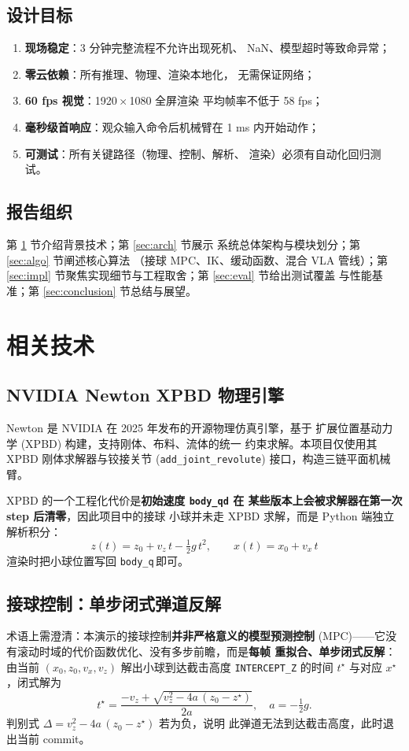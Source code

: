 \documentclass[12pt, a4paper, UTF8]{ctexart}
\begin{document}
\subsection{设计目标}
\begin{enumerate}[leftmargin=*]
  \item \textbf{现场稳定}：3 分钟完整流程不允许出现死机、
    NaN、模型超时等致命异常；
  \item \textbf{零云依赖}：所有推理、物理、渲染本地化，
    无需保证网络；
  \item \textbf{60 fps 视觉}：1920\,$\times$\,1080 全屏渲染
    平均帧率不低于 58 fps；
  \item \textbf{毫秒级首响应}：观众输入命令后机械臂在 1 ms
    内开始动作；
  \item \textbf{可测试}：所有关键路径（物理、控制、解析、
    渲染）必须有自动化回归测试。
\end{enumerate}

\subsection{报告组织}
第 \ref{sec:tech} 节介绍背景技术；第 \ref{sec:arch} 节展示
系统总体架构与模块划分；第 \ref{sec:algo} 节阐述核心算法
（接球 MPC、IK、缓动函数、混合 VLA 管线）；第 \ref{sec:impl}
节聚焦实现细节与工程取舍；第 \ref{sec:eval} 节给出测试覆盖
与性能基准；第 \ref{sec:conclusion} 节总结与展望。

\section{相关技术}\label{sec:tech}

\subsection{NVIDIA Newton XPBD 物理引擎}
Newton 是 NVIDIA 在 2025 年发布的开源物理仿真引擎，基于
扩展位置基动力学 (XPBD) 构建，支持刚体、布料、流体的统一
约束求解。本项目仅使用其 XPBD 刚体求解器与铰接关节
(\texttt{add\_joint\_revolute}) 接口，构造三链平面机械臂。

XPBD 的一个工程化代价是\textbf{初始速度 \texttt{body\_qd} 在
某些版本上会被求解器在第一次 step 后清零}，因此项目中的接球
小球并未走 XPBD 求解，而是 Python 端独立解析积分：
\[ z(t) = z_0 + v_z\, t - \tfrac{1}{2} g\, t^2,
   \qquad x(t) = x_0 + v_x\, t \]
渲染时把小球位置写回 \texttt{body\_q}\,即可。

\subsection{接球控制：单步闭式弹道反解}
术语上需澄清：本演示的接球控制\textbf{并非严格意义的模型预测控制}
(MPC)——它没有滚动时域的代价函数优化、没有多步前瞻，而是\textbf{每帧
重拟合、单步闭式反解}：由当前 $(x_0, z_0,
v_x, v_z)$ 解出小球到达截击高度 \texttt{INTERCEPT\_Z}
的时间 $t^\star$ 与对应 $x^\star$，闭式解为
\[
t^\star = \frac{-v_z + \sqrt{v_z^2 - 4a\,(z_0 - z^\star)}}{2a},
\quad a = -\tfrac{1}{2}g.
\]
判别式 $\Delta = v_z^2 - 4a\,(z_0 - z^\star)$ 若为负，说明
此弹道无法到达截击高度，此时退出当前 commit。
\end{document}
